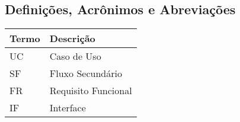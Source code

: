   \subsection{Definições, Acrônimos e Abreviações}
  \FloatBarrier
    \begin{table}[H] 
      \begin{center}
        \begin{tabular}[pos]{|m{2cm} | m{8cm}|} 
          \hline \cellcolor[gray]{0.9}\textbf{Termo} & \cellcolor[gray]{0.9}\textbf{Descrição} \\ \hline
          UC & Caso de Uso  \\ \hline
          SF & Fluxo Secundário \\ \hline
          FR & Requisito Funcional \\ \hline
          IF & Interface \\ \hline
        \end{tabular}
      \end{center}
    \label{tab:definicoes}
    \end{table}